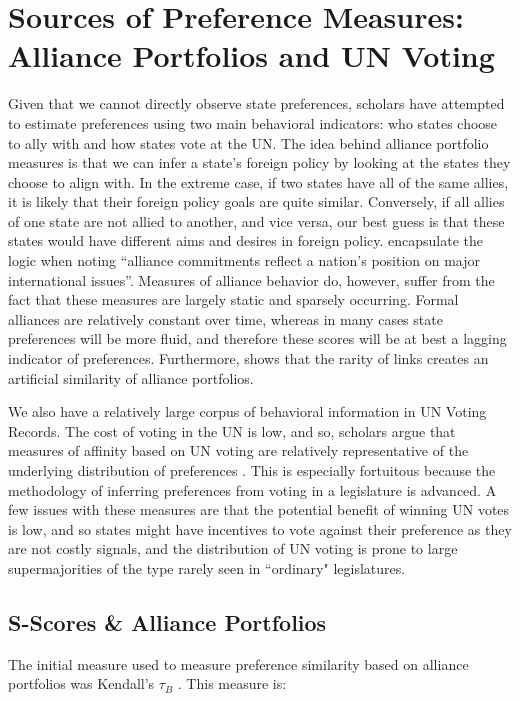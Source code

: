 \section*{Sources of Preference Measures: Alliance Portfolios and UN Voting}

Given that we cannot directly observe state preferences, scholars have attempted to estimate preferences using two main behavioral indicators: who states choose to ally with and how states vote at the UN. The idea behind alliance portfolio measures is that we can infer a state's foreign policy by looking at the states they choose to align with. In the extreme case, if two states have all of the same allies, it is likely that their foreign policy goals are quite similar. Conversely, if all allies of one state are not allied to another, and vice versa, our best guess is that these states would have different aims and desires in foreign policy. \citet{buenodemesquita:lalman:2008} encapsulate the logic when noting ``alliance commitments reflect a nation's position on major international issues''. Measures of alliance behavior do, however, suffer from the fact that these measures are largely static and sparsely occurring. Formal alliances are relatively constant over time, whereas in many cases state preferences will be more fluid, and therefore these scores will be at best a lagging indicator of preferences. Furthermore, \citet{hage:2011} shows that the rarity of links creates an artificial similarity of alliance portfolios.

We also have a relatively large corpus of behavioral information in UN Voting Records. The cost of voting in the UN is low, and so, scholars argue that measures of affinity based on UN voting are relatively representative of the underlying distribution of preferences \citep{gartzke:1998}. This is especially fortuitous because the methodology of inferring preferences from voting in a legislature is advanced. A few issues with these measures are that the potential benefit of winning UN votes is low, and so states might have incentives to vote against their preference as they are not costly signals, and the distribution of UN voting is prone to large supermajorities of the type rarely seen in ``ordinary" legislatures.

\subsection*{S-Scores \& Alliance Portfolios}

 The initial measure used to measure preference similarity based on alliance portfolios was Kendall's $\tau_{B}$ \citep{buenodemesquita:lalman:2008}. This measure is:
 
